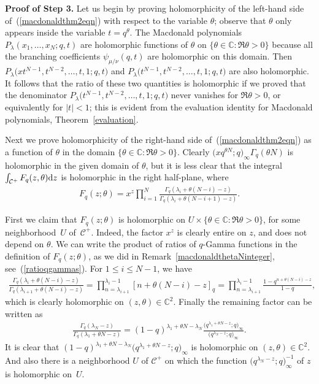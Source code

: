 \documentclass[pdftex]{sigma}
\numberwithin{equation}{section}
\newcommand{\C}{\mathbb{C}}
\newcommand{\CC}{\mathcal{C}}
\begin{document}
\textbf{Proof of Step 3.} Let us begin by proving holomorphicity of the left-hand side of~(\ref{macdonaldthm2eqn}) with respect to the variable $\theta$; observe that $\theta$ only appears inside the variable $t = q^{\theta}$. The Macdonald polynomials $P_{\lambda}(x_1, \dots, x_N; q, t)$ are holomorphic functions of $\theta$ on $\{\theta\in\C\colon \Re\theta > 0\}$ because all the branching coef\/f\/icients $\psi_{\mu/\nu}(q, t)$ are holomorphic on this domain. Then $P_{\lambda}\big(xt^{N-1}, t^{N-2}, \dots, t, 1; q, t\big)$ and $P_{\lambda}\big(t^{N-1}, t^{N-2}, \dots, t, 1; q, t\big)$ are also holomorphic. It follows that the ratio of these two quantities is holomorphic if we proved that the denominator $P_{\lambda}\big(t^{N-1}, t^{N-2}, \dots, t, 1; q, t\big)$ never vanishes for $\Re\theta > 0$, or equivalently for $|t| < 1$; this is evident from the evaluation identity for Macdonald polynomials, Theorem~\ref{evaluation}.

Next we prove holomorphicity of the right-hand side of~(\ref{macdonaldthm2eqn}) as a function of $\theta$ in the domain $\{\theta\in\C\colon \Re\theta > 0\}$. Clearly $\big(xq^{\theta N}; q\big)_{\infty}\Gamma_q(\theta N)$ is holomorphic in the given domain of $\theta$, but it is less clear that the integral $\int_{\CC^+}{F_{q}(z, \theta){\rm d}z}$ is holomorphic in the right half-plane, where
\begin{gather*}
F_q(z; \theta) = x^z\prod\limits_{i=1}^N{\frac{\Gamma_q(\lambda_i + \theta(N-i) - z)}{\Gamma_q(\lambda_i + \theta(N-i+1) - z)}}.
\end{gather*}

First we claim that $F_q(z; \theta)$ is holomorphic on $U\times \{\theta\in\C\colon \Re\theta > 0\}$, for some neighborhood~$U$ of~$\CC^+$. Indeed, the factor $x^z$ is clearly entire on $z$, and does not depend on $\theta$. We can write the product of ratios of $q$-Gamma functions in the def\/inition of $F_q(z; \theta)$, as we did in Remark~\ref{macdonaldthetaNinteger}, see~(\ref{ratioqgammas}). For $1\leq i \leq N-1$, we have
\begin{gather*}
\frac{\Gamma_q(\lambda_i + \theta(N - i) - z)}{\Gamma_q(\lambda_{i+1} + \theta(N - i) - z)} =
\prod_{n = \lambda_{i+1}}^{\lambda_i - 1}{[n + \theta(N - i) - z]_q} =
\prod_{n = \lambda_{i+1}}^{\lambda_i - 1}{\frac{1 - q^{n + \theta(N - i) - z}}{1 - q}},
\end{gather*}
which is clearly holomorphic on $(z, \theta)\in\C^2$. Finally the remaining factor can be written as
\begin{gather*}
\frac{\Gamma_q(\lambda_N - z)}{\Gamma_q(\lambda_1 + \theta N - z)} = (1 - q)^{\lambda_1 + \theta N - \lambda_N}\frac{\big(q^{\lambda_1 + \theta N - z}; q\big)_{\infty}}{\big(q^{\lambda_N - z}; q\big)_{\infty}}.
\end{gather*}
It is clear that $(1 - q)^{\lambda_1 + \theta N - \lambda_N}\big(q^{\lambda_1 + \theta N - z}; q\big)_{\infty}$ is holomorphic on $(z, \theta)\in\C^2$. And also there is a neighborhood $U$ of $\CC^+$ on which the function $\big(q^{\lambda_N - z}; q\big)_{\infty}^{-1}$ of $z$ is holomorphic on~$U$.
\end{document}
